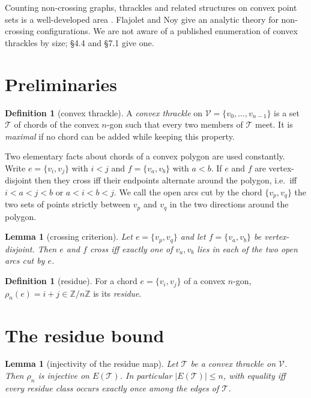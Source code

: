 \documentclass[11pt,a4paper]{article}
\newtheorem{lemma}[theorem]{Lemma}
\theoremstyle{definition}
\newtheorem{definition}[theorem]{Definition}
\theoremstyle{plain}
\newcommand{\V}{\mathcal{V}}
\newcommand{\Thr}{\mathcal{T}}
\begin{document}
Counting non-crossing graphs, thrackles and related structures on convex point
sets is a well-developed area \cite{ADHNU}.  Flajolet and Noy \cite{FN} give an
analytic theory for non-crossing configurations.  We are not aware of a
published enumeration of convex thrackles by size; §4.4 and §7.1 give one.

\section{Preliminaries}

\begin{definition}[convex thrackle]\label{def:thrackle}
A \emph{convex thrackle} on $\V=\{v_0,\dots,v_{n-1}\}$ is a set $\Thr$ of
chords of the convex $n$-gon such that every two members of $\Thr$ meet.  It is
\emph{maximal} if no chord can be added while keeping this property.
\end{definition}

Two elementary facts about chords of a convex polygon are used constantly.
Write $e=\{v_i,v_j\}$ with $i<j$ and $f=\{v_a,v_b\}$ with $a<b$.  If $e$ and
$f$ are vertex-disjoint then they cross iff their endpoints alternate around the
polygon, i.e.\ iff $i<a<j<b$ or $a<i<b<j$.  We call the open arcs cut by the
chord $\{v_p,v_q\}$ the two sets of points strictly between $v_p$ and $v_q$ in
the two directions around the polygon.

\begin{lemma}[crossing criterion]\label{lem:cross}
Let $e=\{v_p,v_q\}$ and let $f=\{v_a,v_b\}$ be vertex-disjoint.  Then $e$ and
$f$ cross iff exactly one of $v_a,v_b$ lies in each of the two open arcs cut by
$e$.
\end{lemma}

\begin{definition}[residue]\label{def:residue}
For a chord $e=\{v_i,v_j\}$ of a convex $n$-gon, $\rho_n(e)=i+j \in
\mathbb{Z}/n\mathbb{Z}$ is its \emph{residue}.
\end{definition}

\section{The residue bound}

\begin{lemma}[injectivity of the residue map]\label{lem:residue}
Let $\Thr$ be a convex thrackle on $\V$.  Then $\rho_n$ is injective on
$E(\Thr)$.  In particular $|E(\Thr)|\le n$, with equality iff every residue
class occurs exactly once among the edges of $\Thr$.
\end{lemma}
\end{document}
